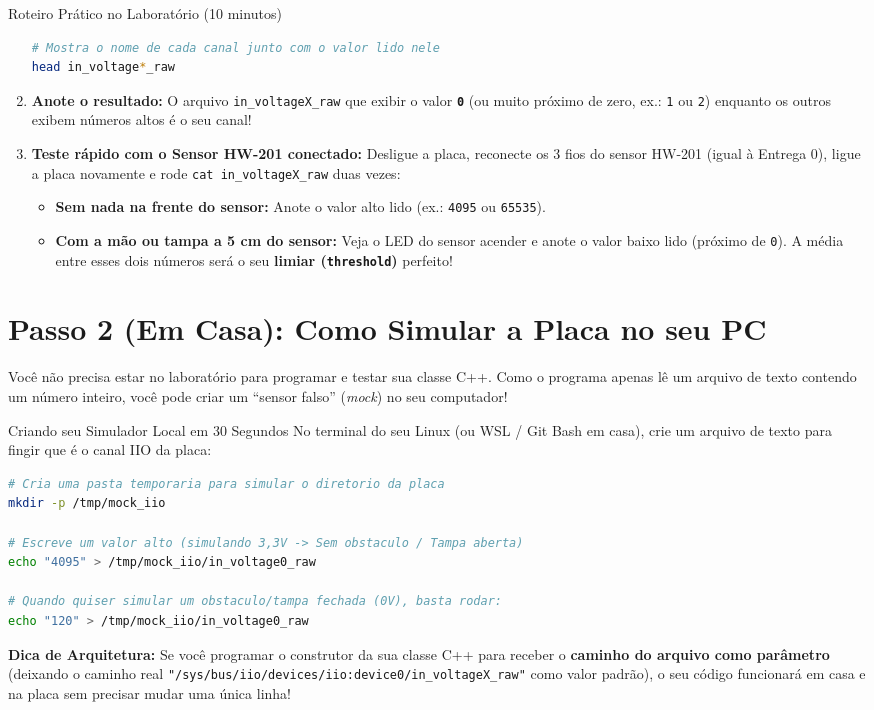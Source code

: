 \documentclass[11pt,a4paper]{article}
\begin{document}
\begin{labbox}{Roteiro Prático no Laboratório (10 minutos)}
\begin{enumerate}[leftmargin=*]
\begin{lstlisting}[language=bash]
# Mostra o nome de cada canal junto com o valor lido nele
head in_voltage*_raw
\end{lstlisting}
    \item \textbf{Anote o resultado:} O arquivo \texttt{in\_voltageX\_raw} que exibir o valor \textbf{\texttt{0}} (ou muito próximo de zero, ex.: \texttt{1} ou \texttt{2}) enquanto os outros exibem números altos é o seu canal!
    \item \textbf{Teste rápido com o Sensor HW-201 conectado:} Desligue a placa, reconecte os 3 fios do sensor HW-201 (igual à Entrega 0), ligue a placa novamente e rode \texttt{cat in\_voltageX\_raw} duas vezes:
    \begin{itemize}
        \item \textbf{Sem nada na frente do sensor:} Anote o valor alto lido (ex.: \texttt{4095} ou \texttt{65535}).
        \item \textbf{Com a mão ou tampa a 5 cm do sensor:} Veja o LED do sensor acender e anote o valor baixo lido (próximo de \texttt{0}). A média entre esses dois números será o seu \textbf{limiar (\texttt{threshold})} perfeito!
    \end{itemize}
\end{enumerate}
\end{labbox}

\section{Passo 2 (Em Casa): Como Simular a Placa no seu PC}

Você não precisa estar no laboratório para programar e testar sua classe C++. Como o programa apenas lê um arquivo de texto contendo um número inteiro, você pode criar um ``sensor falso'' (\textit{mock}) no seu computador!

\begin{homebox}{Criando seu Simulador Local em 30 Segundos}
No terminal do seu Linux (ou WSL / Git Bash em casa), crie um arquivo de texto para fingir que é o canal IIO da placa:
\begin{lstlisting}[language=bash]
# Cria uma pasta temporaria para simular o diretorio da placa
mkdir -p /tmp/mock_iio

# Escreve um valor alto (simulando 3,3V -> Sem obstaculo / Tampa aberta)
echo "4095" > /tmp/mock_iio/in_voltage0_raw

# Quando quiser simular um obstaculo/tampa fechada (0V), basta rodar:
echo "120" > /tmp/mock_iio/in_voltage0_raw
\end{lstlisting}
\textbf{Dica de Arquitetura:} Se você programar o construtor da sua classe C++ para receber o \textbf{caminho do arquivo como parâmetro} (deixando o caminho real \texttt{"/sys/bus/iio/devices/iio:device0/in\_voltageX\_raw"} como valor padrão), o seu código funcionará em casa e na placa sem precisar mudar uma única linha!
\end{homebox}
\end{document}
